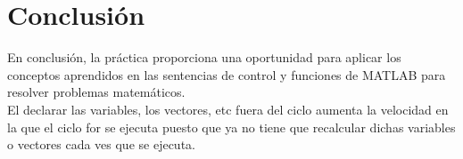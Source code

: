 \documentclass{article}
\begin{document}
	\newpage
	\section{Conclusión}
	
	En conclusión, la práctica proporciona una oportunidad para aplicar los conceptos aprendidos en las sentencias de control y funciones de MATLAB para resolver problemas matemáticos.
	\\
	
	El declarar las variables, los vectores, etc fuera del ciclo aumenta la velocidad en la que el ciclo for se ejecuta puesto que ya no tiene que recalcular dichas variables o vectores cada ves que se ejecuta.
	
\end{document}
